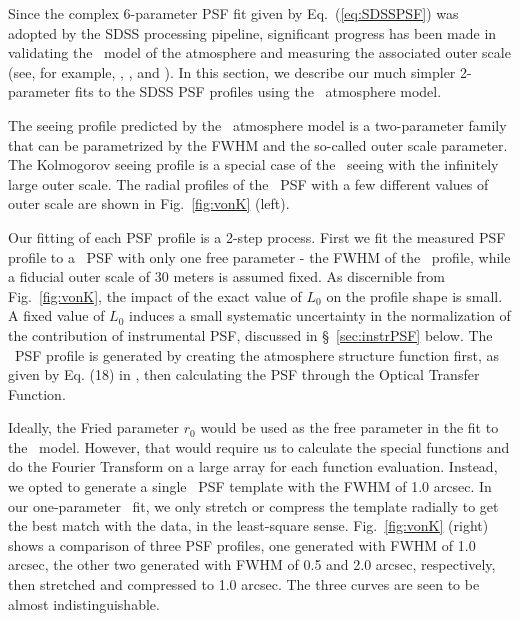 

Since the complex 6-parameter PSF fit given by Eq.~(\ref{eq:SDSSPSF}) was adopted by 
the SDSS processing pipeline, significant progress has been made in validating the 
\vk~model of the atmosphere and measuring the associated outer
scale (see, for example, \citealt{Tokovinin2002}, \citealt{Boccas2004}, and \citealt{MartinezMessenger}).
In this section, we describe our much simpler 2-parameter fits to the SDSS PSF
profiles using the \vk~atmosphere model.

The seeing profile predicted by the \vk~atmosphere model is a two-parameter
family that can be parametrized by the FWHM and the so-called outer scale
parameter. The Kolmogorov seeing profile is a special case of the 
\vk~seeing with the infinitely large outer scale. The radial profiles of the 
\vk~PSF with a few different values of outer scale are shown in Fig.~\ref{fig:vonK} (left). 


Our fitting of each PSF profile is a 2-step process. First we fit the
measured PSF profile to a \vk~PSF with only one free parameter -
the FWHM of the \vk~profile, while a fiducial outer scale of 30 meters
is assumed fixed. As discernible from Fig.~\ref{fig:vonK}, the impact of the exact
value of $L_0$ on the profile shape is small. A fixed value of $L_0$ induces a small 
systematic uncertainty in the normalization of the contribution of instrumental PSF, 
discussed in \S~\ref{sec:instrPSF}  below. The \vk~PSF profile is generated by creating 
the atmosphere structure function first, as given by Eq. (18) in \cite{Tokovinin2002},
then calculating the PSF through the Optical Transfer Function. 

Ideally, the Fried parameter $r_0$ would be used as the free
parameter in the fit to the \vk~model. However, 
that would require us to calculate the special functions and do the
Fourier Transform on a large array for each function evaluation.
Instead, we opted to generate a single \vk~PSF template with the FWHM of 
1.0 arcsec. In our one-parameter \vk~fit, we only stretch or compress
the template radially to get the best match with the data, in the
least-square sense.
Fig.~\ref{fig:vonK} (right) shows a comparison of three PSF profiles,
one generated with FWHM of 1.0 arcsec, the other two generated with
FWHM of 0.5 and 2.0 arcsec, respectively, then stretched and
compressed to 1.0 arcsec. The three curves are seen to be almost
indistinguishable.


